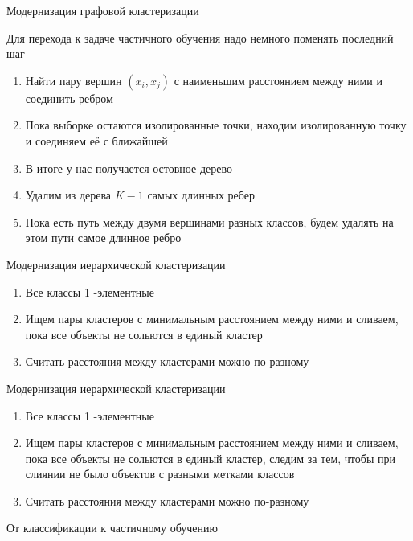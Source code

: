 \documentclass[notes,12pt, aspectratio=169]{beamer}
\newenvironment{transitionframe}{
  \setbeamercolor{background canvas}{bg=yellow}
  \begin{frame}}{
    \end{frame}
}
\begin{document}
\begin{frame}{Модернизация графовой кластеризации}

Для перехода к задаче частичного обучения надо немного поменять последний шаг 

\begin{enumerate}
	\item Найти пару вершин $(x_i, x_j)$ с наименьшим расстоянием между ними и соединить ребром
	\item Пока  выборке остаются изолированные точки, находим изолированную точку и соединяем её с ближайшей 
	\item В итоге у нас получается остовное  дерево 
	\item \sout{Удалим из дерева $K-1$ самых длинных ребер}
	\item {\color{red} Пока есть путь между двумя вершинами разных классов, будем удалять на этом пути самое длинное ребро}
\end{enumerate}
\end{frame}

\begin{frame}{Модернизация иерархической кластеризации}

\begin{enumerate}
	\item Все классы 1 -элементные
	\item Ищем пары кластеров с минимальным расстоянием между ними и сливаем, пока все объекты не сольются в единый кластер 
	\item Считать расстояния между кластерами можно по-разному  
\end{enumerate}
\end{frame}

\begin{frame}{Модернизация иерархической кластеризации}

\begin{enumerate}
	\item Все классы 1 -элементные
	\item Ищем пары кластеров с минимальным расстоянием между ними и сливаем, пока все объекты не сольются в единый кластер, {\color{red} следим за тем, чтобы при слиянии не было объектов с разными метками классов} 
	\item Считать расстояния между кластерами можно по-разному  
\end{enumerate}
\end{frame}


 \begin{transitionframe}
	\begin{center}
		\Huge От классификации к частичному обучению
	\end{center}
\end{transitionframe}
\end{document}
